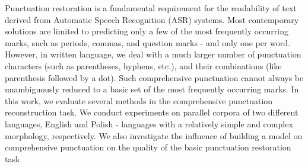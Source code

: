 Punctuation restoration is a fundamental requirement for the readability of text derived from  Automatic Speech Recognition (ASR) systems. Most contemporary solutions are limited to predicting only a few of the most frequently occurring marks, such as periods, commas, and question marks - and only one per word. However, in written language, we deal with a much larger number of punctuation characters (such as parentheses, hyphens, etc.), and their combinations (like parenthesis followed by a dot). Such comprehensive punctuation cannot always be unambiguously reduced to a basic set of the most frequently occurring marks. In this work, we evaluate several methods in the comprehensive punctuation reconstruction task. We conduct experiments on parallel corpora of two different languages, English and Polish - languages with a relatively simple and complex morphology, respectively. We also investigate the influence of building a model on comprehensive punctuation on the quality of the basic punctuation restoration task
